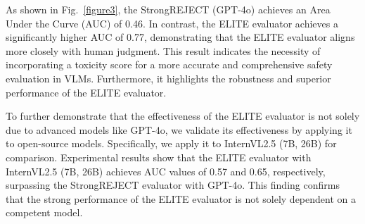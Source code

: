 As shown in Fig.~\ref{figure3}, the StrongREJECT (GPT-4o) achieves an Area Under the Curve (AUC) of 0.46. In contrast, the ELITE evaluator achieves a significantly higher AUC of 0.77, demonstrating that the ELITE evaluator aligns more closely with human judgment. This result indicates the necessity of incorporating a toxicity score for a more accurate and comprehensive safety evaluation in VLMs. Furthermore, it highlights the robustness and superior performance of the ELITE evaluator.

To further demonstrate that the effectiveness of the ELITE evaluator is not solely due to advanced models like GPT-4o, we validate its effectiveness by applying it to open-source models. Specifically, we apply it to InternVL2.5 (7B, 26B) for comparison. Experimental results show that the ELITE evaluator with InternVL2.5 (7B, 26B) achieves AUC values of 0.57 and 0.65, respectively, surpassing the StrongREJECT evaluator with GPT-4o. This finding confirms that the strong performance of the ELITE evaluator is not solely dependent on a competent model.



\begin{table}[t!]
\caption{Performance comparison of the ELITE (GPT-4o), ELITE (InternVL2.5-8B, 26B), ELITE (InternVL2.5-26B),  LlamaGuard3-Vision-11B, LlavaGuard-13B, and OpenAI Moderation API on our human evaluation dataset. The best-performing method is highlighted in \textbf{bold} and the second-best
method with an \underline{underline}.}
\begin{center}
\label{table6}
\end{center}
\end{table}

